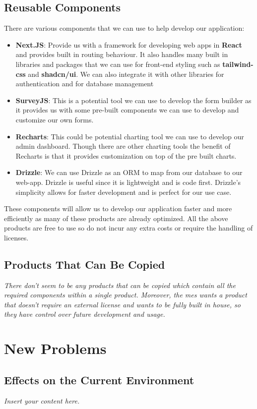 \documentclass[12pt]{article}
\newcommand{\lips}{\textit{Insert your content here.}}
\begin{document}
\subsection{Reusable Components}
There are various components that we can use to help develop our application:
\begin{itemize}
  \item \textbf{Next.JS}: Provide us with a framework for developing web apps in \textbf{React} and provides built in
    routing behaviour. It also handles many built in libraries and packages that we can use for front-end styling such
    as \textbf{tailwind-css} and \textbf{shadcn/ui}. We can also integrate it with other libraries for authentication
    and for database management
  \item \textbf{SurveyJS}: This is a potential tool we can use to develop the form builder as it provides us with some
    pre-built components we can use to develop and customize our own forms.
  \item \textbf{Recharts}: This could be potential charting tool we can use to develop our admin dashboard. Though there
    are other charting tools the benefit of Recharts is that it provides customization on top of the pre built charts.
  \item \textbf{Drizzle}: We can use Drizzle as an ORM to map from our database to our web-app. Drizzle is useful since
    it is lightweight and is code first. Drizzle's simplicity allows for faster development and is perfect for our use
    case.
\end{itemize}
These components will allow us to develop our application faster and more efficiently as many of these products are
already optimized. All the above products are free to use so do not incur any extra costs or require the handling of
licenses.
\subsection{Products That Can Be Copied}
\textit{There don't seem to be any products that can be copied which contain all the required components within a single
product. Moreover, the \gls{mes} wants a product that doesn't require an external license and wants to be fully built in
house, so they have control over future development and usage.}

\section{New Problems}
\subsection{Effects on the Current Environment}
\lips
\end{document}
